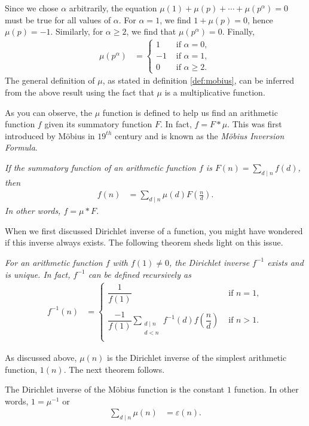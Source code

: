 \documentclass[12pt]{subfile}
\begin{document}
	Since we chose $\alpha$ arbitrarily, the equation $\mu(1) + \mu(p) + \cdots + \mu(p^\alpha)=0$ must be true for all values of $\alpha$. For $\alpha=1$, we find $1 + \mu(p) = 0$, hence $\mu(p)=-1$. Similarly, for $\alpha\geq 2$, we find that $\mu(p^\alpha)=0$. Finally,
		\begin{align*}
			\mu(p^\alpha) & = \begin{cases}
			1&\mbox{ if }\alpha=0,\\
			-1&\mbox{ if }\alpha=1,\\
			0&\mbox{ if }\alpha\geq 2.
			\end{cases}
		\end{align*}
	The general definition of $\mu$, as stated in definition \ref{def:mobius}, can be inferred from the above result using the fact that $\mu$ is a multiplicative function.

	As you can observe, the $\mu$ function is defined to help us find an arithmetic function $f$ given its summatory function $F$. In fact, $f=F \ast \mu$. This was first introduced by M\"{o}bius in $19^{th}$ century and is known as the \textit{M\"{o}bius Inversion Formula}.

		\begin{theorem}\slshape
			\label{thm:mobinv}
			If the summatory function of an arithmetic function $f$ is $\displaystyle F(n)=\sum\limits_{d\mid n}f(d)$, then
			\begin{align*}
			f(n) & =\sum_{d\mid n}\mu(d)F\left(\frac nd\right).
			\end{align*}
			In other words, $f=\mu\ast F$.
		\end{theorem}


	When we first discussed Dirichlet inverse of a function, you might have wondered if this inverse always exists. The following theorem sheds light on this issue.

		\begin{theorem}\slshape \label{thm:dirichletinverse}
			For an arithmetic function $f$ with $f(1)\neq0$, the Dirichlet inverse $f^{-1}$ exists and is unique. In fact, $f^{-1}$ can be defined recursively as
				\begin{align*}
				f^{-1}(n) & = \begin{cases}
				\dfrac1{f(1)}&\mbox{ if }n=1,\\ \\
				\displaystyle\dfrac{-1}{f(1)}\sum_{\substack{d\mid n\\d<n}}f^{-1}(d)f\left(\dfrac nd\right)&\mbox{ if }n>1.\\
				\end{cases}
		\end{align*}
		\end{theorem}
	As discussed above, $\mu(n)$ is the Dirichlet inverse of the simplest arithmetic function, $1(n)$. The next theorem follows.
		\begin{theorem}
			\label{thm:mobiusinverse}
			The Dirichlet inverse of the M\"{o}bius function is the constant $1$ function. In other words, $1=\mu^{-1}$ or
			\begin{align*}
			\sum_{d\mid n}\mu(n) & =\varepsilon(n).
			\end{align*}
		\end{theorem}
\end{document}
